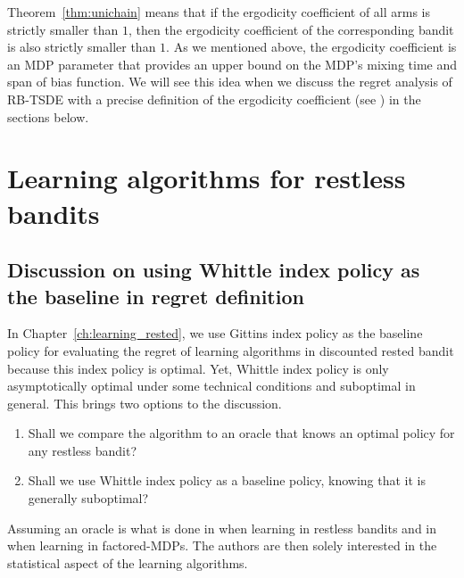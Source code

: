 Theorem~\ref{thm:unichain} means that if the ergodicity coefficient of all arms is strictly smaller than $1$, then the ergodicity coefficient of the corresponding bandit is also strictly smaller than $1$.
As we mentioned above, the ergodicity coefficient is an MDP parameter that provides an upper bound on the MDP's mixing time and span of bias function.
We will see this idea when we discuss the regret analysis of RB-TSDE \cite{akbarzadeh2022learning} with a precise definition of the ergodicity coefficient (see ) in the sections below.

\section{Learning algorithms for restless bandits}
\label{ch:restless:sec:generic}

\subsection{Discussion on using Whittle index policy as the baseline in regret definition}
\label{ch:restless:discuss_policy}

In Chapter~\ref{ch:learning_rested}, we use Gittins index policy as the baseline policy for evaluating the regret of learning algorithms in discounted rested bandit because this index policy is optimal.
Yet, Whittle index policy is only asymptotically optimal under some technical conditions \cite{weber1990index} and suboptimal in general.
This brings two options to the discussion.
\begin{enumerate}[label=(\alph*)]
    \item Shall we compare the algorithm to an oracle that knows an optimal policy for any restless bandit?
    \item \label{it:second_baseline} Shall we use Whittle index policy as a baseline policy, knowing that it is generally suboptimal?
\end{enumerate}

Assuming an oracle is what is done in \cite{ortner2012regret, jung2019thompson, wang2020restless} when learning in restless bandits and in \cite{osband2014near, rosenberg2020oracle, xu2020reinforcement} when learning in factored-MDPs.
The authors are then solely interested in the statistical aspect of the learning algorithms.

